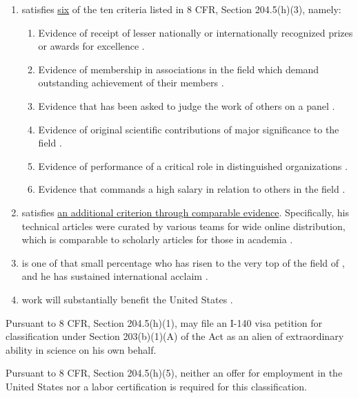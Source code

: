 \begin{enumerate}

    \item \mrl satisfies \underline{six} of the ten criteria listed in 8
    CFR, Section 204.5(h)(3), namely:

    \begin{enumerate}[label=\roman*.]

        \item Evidence of \mrls receipt of lesser nationally or internationally recognized prizes
        or awards for excellence .

        \item Evidence of \mrls membership in associations in the field which demand
        outstanding achievement of their members .

        \addtocounter{enumii}{1} %
        \item Evidence that \mrl has been asked to judge the work of others on a panel
        .

        \item Evidence of \mrls original scientific contributions of major significance
        to the field .

        \addtocounter{enumii}{2} %
        \item Evidence of \mrls performance of a critical role in distinguished organizations
        .

        \item Evidence that \mrl commands a high salary in relation to others in the field
        .

    \end{enumerate}

    \item \mrl satisfies \ul{an additional criterion through comparable evidence}.
    Specifically, his technical articles were curated by various teams for wide online distribution,
    which is comparable to scholarly articles for those in academia .

    \item \mrl is one of that small percentage who has risen to the very top
    of the field of \fie, and he has sustained international acclaim .

    \item \mrls work will substantially benefit the United States .

\end{enumerate}

Pursuant to 8 CFR, Section 204.5(h)(1),
\mrl may file an I-140 visa petition for classification under
Section 203(b)(1)(A) of the Act as an alien of extraordinary ability in science
on his own behalf.

Pursuant to 8 CFR, Section 204.5(h)(5),
neither an offer for employment in the United States nor a labor certification
is required for this classification.

\pagebreak
